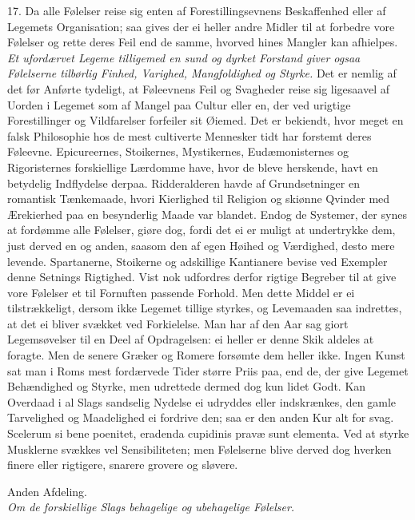 \documentclass[12pt,a4paper]{article}
\newcommand{\afdeling}[2]{%
  \medskip\begin{center}{\large #1}\\[4pt]{\emph{#2}}\end{center}\smallskip}
\newcommand{\opage}[1]{\marginnote{\footnotesize\textit{[#1]}}}
\begin{document}
17. Da alle Følelser reise sig enten af Forestillingsevnens Beskaffenhed eller af Legemets
Organisation; saa gives der ei heller andre Midler til at forbedre vore Følelser og rette
deres Feil end de samme, hvorved hines
\opage{226} Mangler kan afhielpes. \emph{Et ufordærvet Legeme tilligemed en sund og dyrket Forstand
giver ogsaa Følelserne tilbørlig Finhed, Varighed, Mangfoldighed og Styrke.} Det er nemlig
af det før Anførte tydeligt, at Føleevnens Feil og Svagheder reise sig ligesaavel af Uorden
i Legemet som af Mangel paa Cultur eller en, der ved urigtige Forestillinger og
Vildfarelser forfeiler sit Øiemed. Det er bekiendt, hvor meget en falsk Philosophie hos de
mest cultiverte Mennesker tidt har forstemt deres Føleevne. Epicureernes, Stoikernes,
Mystikernes, Eudæmonisternes og Rigoristernes forskiellige Lærdomme have, hvor de bleve
herskende, havt en betydelig Indflydelse derpaa. Ridderalderen havde af Grundsetninger en
romantisk Tænkemaade, hvori Kierlighed til Religion og skiønne Qvinder med Ærekierhed paa
en besynderlig Maade var blandet. Endog de Systemer, der synes at fordømme alle Følelser,
giøre dog, fordi det ei er muligt at undertrykke dem, just derved en og anden, saasom den
af egen Høihed og Værdighed, desto mere levende. Spartanerne, Stoikerne og adskillige
Kantianere bevise ved Exempler denne Setnings Rigtighed. Vist nok udfordres derfor rigtige
Begreber til at give vore Følelser et til Fornuften passende Forhold. Men dette Middel er
ei tilstrækkeligt, dersom ikke Legemet tillige styrkes, og Levemaaden saa indrettes, at det
ei bliver svækket ved Forkielelse. Man har af den Aar%
\opage{227}sag giort Legemsøvelser til en Deel af Opdragelsen: ei heller er denne Skik aldeles at
foragte. Men de senere Græker og Romere forsømte dem heller ikke. Ingen Kunst sat man i
Roms mest fordærvede Tider større Priis paa, end de, der give Legemet Behændighed og
Styrke, men udrettede dermed dog kun lidet Godt. Kan Overdaad i al Slags sandselig Nydelse
ei udryddes eller indskrænkes, den gamle Tarvelighed og Maadelighed ei fordrive den; saa
er den anden Kur alt for svag. Scelerum si bene poenitet, eradenda cupidinis pravæ sunt
elementa. Ved at styrke Musklerne svækkes vel Sensibiliteten; men Følelserne blive derved
dog hverken finere eller rigtigere, snarere grovere og sløvere.

\afdeling{Anden Afdeling.}{Om de forskiellige Slags behagelige og ubehagelige Følelser.}
\end{document}
